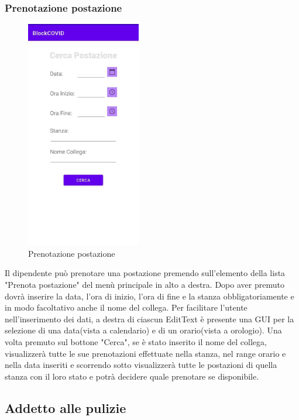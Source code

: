 \subsubsection{Prenotazione postazione}
\begin{figure}[H]
	\centering
	\includegraphics[width=5cm]{res/images/PrenotaPostazione.png}
	\caption{Prenotazione postazione}
\end{figure}
Il dipendente può prenotare una postazione premendo sull'elemento della lista "Prenota postazione" del menù principale in alto a destra.
Dopo aver premuto dovrà inserire la data, l'ora di inizio, l'ora di fine e la stanza obbligatoriamente e in modo facoltativo anche il nome del collega. Per facilitare l'utente nell'inserimento dei dati, a destra di ciascun EditText è presente una GUI per la selezione di una data(vista a calendario) e di un orario(vista a orologio). Una volta premuto sul bottone "Cerca", se è stato inserito il nome del collega, visualizzerà tutte le sue prenotazioni effettuate nella stanza, nel range orario e nella data inseriti e scorrendo sotto visualizzerà tutte le postazioni di quella stanza con il loro stato e potrà decidere quale prenotare se disponibile. 




\subsection{Addetto alle pulizie}